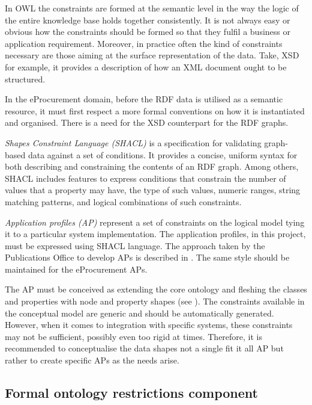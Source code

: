 	In OWL the constraints are formed at the semantic level in the way the logic of the entire knowledge base holds together consistently. It is not always easy or obvious how the constraints should be formed so that they fulfil a business or application requirement. Moreover, in practice often the kind of constraints necessary are those aiming at the surface representation of the data. Take, XSD for example, it provides a description of how an XML document ought to be structured.
	
	In the eProcurement domain, before the RDF data is utilised as a semantic resource, it must first respect a more formal conventions on how it is instantiated and organised. There is a need for the XSD counterpart for the RDF graphs. 
	
	\textit{Shapes Constraint Language (SHACL)} \cite{shacl-spec} is a specification for validating graph-based data against a set of conditions. It provides a concise, uniform syntax for both describing and constraining the contents of an RDF graph. Among others, SHACL includes features to express conditions that constrain the number of values that a property may have, the type of such values, numeric ranges, string matching patterns, and logical combinations of such constraints.

	\textit{Application profiles (AP)} represent a set of constraints on the logical model tying it to a particular system implementation. The application profiles, in this project, must be expressed using SHACL language. The approach taken by the Publications Office to develop APs is described in \citep{costetchi2016}. The same style should be maintained for the eProcurement APs. 
	
	The AP must be conceived as extending the core ontology and fleshing the classes and properties with node and property shapes (see \cite[Sec 2.2--2.3]{shacl-spec}). The constraints available in the conceptual model are generic and should be automatically generated. However, when it comes to integration with specific systems, these constraints may not be sufficient, possibly even too rigid at times. Therefore, it is recommended to conceptualise the data shapes not a single fit it all AP but rather to create specific APs as the needs arise. 
	
	\subsection{Formal ontology restrictions component}
	\label{sec:restrictions}
	
